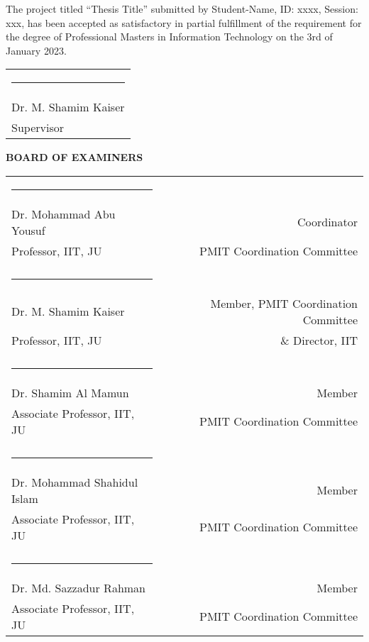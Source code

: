 The project titled “Thesis Title” submitted by Student-Name, ID: xxxx, Session: xxx, has been accepted as satisfactory in partial fulfillment of the requirement for the degree of Professional Masters in Information Technology on the 3rd of January 2023.


\bigskip
\bigskip
\bigskip

\noindent \begin{tabular}{l}

  \rule{4cm}{1pt} \\
  Dr. M. Shamim Kaiser\\ %
  Supervisor\\

\end{tabular}




\begin{center}
   \textbf{BOARD OF EXAMINERS}
\end{center}
\noindent \begin{tabular}{lp{1cm}r}
\centering
  \rule{4cm}{1pt}&\\
     Dr. Mohammad Abu Yousuf  &&Coordinator  \\
     Professor, IIT, JU  & & PMIT Coordination Committee  \\
     & &  \\
     \rule{4cm}{1pt}&\\
    Dr. M. Shamim Kaiser  & &Member, PMIT Coordination Committee   \\
     Professor, IIT, JU  & &\& Director, IIT\\
    & &  \\
     \rule{4cm}{1pt}&\\
     Dr. Shamim Al Mamun & &Member  \\
      Associate Professor, IIT, JU  & &PMIT Coordination Committee  \\
     &  \\
     \rule{4cm}{1pt}&\\
     Dr. Mohammad Shahidul Islam   & &Member  \\
      Associate Professor, IIT, JU  & &PMIT Coordination Committee  \\
      &  \\
     \rule{4cm}{1pt}&\\
     Dr. Md. Sazzadur Rahman  & &Member  \\
      Associate Professor, IIT, JU  & &PMIT Coordination Committee  \\
     
   

\end{tabular}


